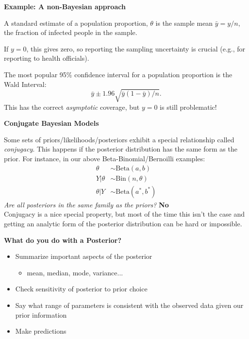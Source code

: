 \documentclass[12pt,xcolor=svgnames]{beamer}
\newcommand{\rd}{\color{red}}
\newcommand{\bl}{\color{blue}}
\newcommand{\theme}{\color{FireBrick}}
\newcommand{\mr}[1]{\mathrm{#1}}
\newcommand{\sk}{\vspace{.4cm}}
\newcommand{\chap}[1]{{\theme \Large \bf #1} \sk}
\begin{document}
\begin{frame}
\chap{Example: A non-Bayesian approach}

A standard estimate of a population proportion, $\theta$ is the sample mean  $\bar{y} = y/n$, the fraction of infected people in the sample. 

\sk
If $y=0$, this gives zero, so reporting the sampling uncertainty is crucial (e.g., for reporting to health officials). 

\sk
The most popular 95\% confidence interval for a population proportion is the {\bl Wald Interval}:
\begin{equation*}
\bar{y} \pm 1.96 \sqrt{\bar{y}(1-\bar{y})/n}.
\end{equation*}
This has the correct {\it asymptotic} coverage, but {\rd $y=0$ is still problematic}!

\end{frame}



\begin{frame}
\chap{Conjugate Bayesian Models}

Some sets of priors/likelihoods/posteriors exhibit a special relationship called {\em \bl conjugacy}. This happens if the posterior distribution has the same form as the prior. For instance, in our above Beta-Binomial/Bernoilli examples:
\begin{align*}
\theta & \sim \mr{Beta} (a,b)\\
Y|\theta &  \sim \mr{Bin} (n, \theta)\\
\theta | Y & \sim \mr{Beta}(a^*, b^*)
\end{align*}
{\em Are all posteriors in the same family as the priors?} {\rd \bf No}\\

Conjugacy is a nice special property, but most of the time this isn't the case and getting an analytic form of the posterior distribution can be hard or impossible.  

\end{frame}

\begin{frame}
\chap{What do you do with a Posterior?}

\begin{itemize}
\item Summarize important aspects of the posterior
	\begin{itemize}
	\item mean, median, mode, variance...
	\end{itemize}
\item Check sensitivity of posterior to prior choice
\item Say what range of parameters is consistent with the observed data given our prior information
\item Make predictions
\end{itemize}

\end{frame}
\end{document}
